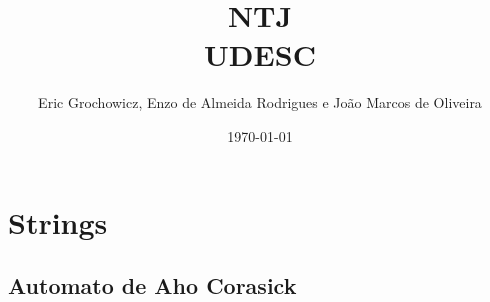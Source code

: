 \documentclass[11pt, a4paper, twoside]{article}
\title{NTJ \\ UDESC}
\author{Eric Grochowicz, Enzo de Almeida Rodrigues e João Marcos de Oliveira}
\begin{document}
\date{\today}
\maketitle


\renewcommand{\contentsname}{Índice} %
\tableofcontents
\clearpage


%
%

\section{Strings}

\subsection{Automato de Aho Corasick}
\end{document}
